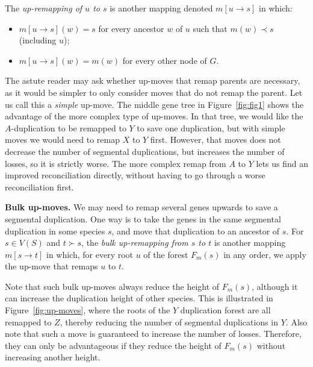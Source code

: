 \documentclass[10pt]{article}
\begin{document}
The \emph{up-remapping of $u$ to $s$} is another mapping denoted $m[u \rightarrow s]$ in which:
\begin{itemize}
    \item 
    $m[u \rightarrow s](w) = s$ for every ancestor $w$ of $u$ such that $m(w) \prec s$ (including $u$);

    \item 
    $m[u \rightarrow s](w) = m(w)$ for every other node of $G$.
    
\end{itemize}
The astute reader may ask whether up-moves that remap parents are necessary, as it would be simpler to only consider moves that do not remap the parent.  Let us call this a \emph{simple} up-move.  The middle gene tree in Figure~\ref{fig:fig1} shows the advantage of the more complex type of up-moves.  In that tree, we would like the $A$-duplication to be remapped to $Y$ to save one duplication, but with simple moves we would need to remap $X$ to $Y$ first.  However, that moves does not decrease the number of segmental duplications, but increases the number of losses, so it is strictly worse.  The more complex remap from $A$ to $Y$ lets us find an improved reconciliation directly, without having to go through a worse reconciliation first.


\medskip 

\noindent
\textbf{Bulk up-moves.}  We may need to remap several genes upwards to save a segmental duplication.  One way is to take the genes in the same segmental duplication in some species $s$, and move that duplication to an ancestor of $s$.
For $s \in V(S)$ and $t \succ s$, the \emph{bulk up-remapping from $s$ to $t$}
is another mapping $m[s \rightarrow t]$ in which, for every root $u$ of the forest $F_m(s)$ in any order, we apply the up-move that remaps $u$ to $t$.  



Note that such bulk up-moves always reduce the height of $F_m(s)$, although it can increase
the duplication height of other species.  
This is illustrated in Figure~\ref{fig:up-moves}, where the roots of the $Y$ duplication forest are all remapped to $Z$, thereby reducing the number of segmental duplications in $Y$.  Also note that such a move is guaranteed to increase the number of losses.  Therefore, they can only be advantageous if they reduce the height of $F_m(s)$ without increasing another height.  
\end{document}
